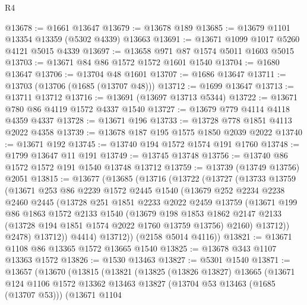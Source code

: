 \begin{lexlean}{R4}
\begin{coremodule}
@13678 := @1661 @13647
@13679 := @13678 @189
@13685 := @13679 @1101 @13354 @13359 (@5302 @4339) @13663
@13691 := @13671 @1099 @1017 @5260 @4121 @5015 @4339
@13697 := @13658 @971 @87 @1574 @5011 @1603 @5015
@13703 := @13671 @84 @86 @1572 @1572 @1601 @1540
@13704 := @1680 @13647
@13706 := @13704 @48 @1601
@13707 := @1686 @13647
@13711 := @13703 (@13706 (@1685 (@13707 @48)))
@13712 := @1699 @13647
@13713 := @13711 @13712
@13716 := @13691 (@13697 @13713 @5344)
@13722 := @13671 @780 @86 @4119 @1572 @4337 @1540
@13727 := @13679 @779 @4114 @4118 @4359 @4337
@13728 := @13671 @196
@13733 := @13728 @778 @1851 @4113 @2022 @4358
@13739 := @13678 @187 @195 @1575 @1850 @2039 @2022
@13740 := @13671 @192
@13745 := @13740 @194 @1572 @1574 @191 @1760
@13748 := @1799 @13647 @11 @191
@13749 := @13745 @13748
@13756 := @13740 @86 @1572 @1572 @191 @1540 @13748 @13712
@13759 := @13739 (@13749 @13756) @2051
@13815 := @13677
    (@13685
      (@13716
        (@13722
          (@13727
            (@13733
              @13759
              (@13671
                @253
                @86
                @2239
                @1572
                @2445
                @1540
                (@13679
                  @252
                  @2234
                  @2238
                  @2460
                  @2445
                  (@13728
                    @251
                    @1851
                    @2233
                    @2022
                    @2459
                    @13759
                    (@13671
                      @199
                      @86
                      @1863
                      @1572
                      @2133
                      @1540
                      (@13679
                        @198
                        @1853
                        @1862
                        @2147
                        @2133
                        (@13728 @194 @1851 @1574 @2022 @1760 @13759 @13756)
                        @2160)
                      @13712))
                  @2478)
                @13712))
            @4414)
          @13712))
      (@2158 @5014 @4116))
@13821 := @13671 @1108 @86 @13365 @1572 @13665 @1540
@13825 := @13678 @343 @1107 @13363 @1572
@13826 := @1530 @13463
@13827 := @5301 @1540
@13871 := @13657
    (@13670
      (@13815
        (@13821
          (@13825
            (@13826 @13827)
            @13665
            (@13671
              @124
              @1106
              @1572
              @13362
              @13463
              @13827
              (@13704 @53 @13463 (@1685 (@13707 @53)))
              (@13671
                @1104

\end{coremodule}
\end{lexlean}
